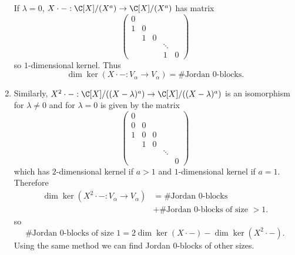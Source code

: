 \documentclass[a4paper]{article}
\theoremstyle{definition}
\begin{document}
\begin{remark}
\begin{enumerate}
    If \(\lambda = 0\), \(X \cdot -: \C[X]/(X^a) \to \C[X]/(X^a)\) has matrix
    \[
      \begin{pmatrix}
        0 \\
        1 & 0 \\
        & 1 & 0 \\
        & & & \ddots \\
        & & & 1 & 0
      \end{pmatrix}
    \]
    so \(1\)-dimensional kernel. Thus
    \[
      \dim \ker (X \cdot -: V_\alpha \to V_\alpha) = \# \text{Jordan \(0\)-blocks}.
    \]
  \item Similarly, \(X^2 \cdot -: \C[X]/((X - \lambda)^a) \to \C[X]/((X - \lambda)^a)\) is an isomorphism for \(\lambda \neq 0\) and for \(\lambda = 0\) is given by the matrix
    \[
      \begin{pmatrix}
        0 \\
        0 & 0 \\
        1 & 0 & 0 \\
        & 1 & 0 & \\
        & & & \ddots \\
        & & & & 0
      \end{pmatrix}
    \]
    which has \(2\)-dimensional kernel if \(a > 1\) and \(1\)-dimensional kernel if \(a = 1\). Therefore
    \begin{align*}
      \dim \ker (X^2 \cdot -: V_\alpha \to V_\alpha) &= \# \text{Jordan \(0\)-blocks} \\
                                                     &+ \# \text{Jordan \(0\)-blocks of size \(> 1\)}.
    \end{align*}
    so
    \[
      \# \text{Jordan \(0\)-blocks of size \(1\)} = 2 \dim \ker (X \cdot -) - \dim \ker (X^2 \cdot -).
    \]
    Using the same method we can find Jordan \(0\)-blocks of other sizes.
    \iffalse
    \begin{align*}
      \dim (X^r \cdot -: V_\alpha \to V_\alpha) &= \# \text{Jordan \(0\)-blocks} \\
                                                &+ \sum_{i = 1}^{r - 1} \# \text{Jordan \(0\)-blocks of size \(> i\)} \\
      \sum_{i = 1}^{r - 1} \# \text{blocks of size \(\leq i\)} &= r \cdot \dim \ker (X \cdot -) - \dim \ker (X^r \cdot -) \\
      \# \text{blocks of size \(\leq r - 1\)} &= r \cdot \dim \ker (X \cdot -) - \dim \ker (X^r \cdot -) \\
                                                &- (r - 1) \cdot \dim \ker (X \cdot -) + \dim \ker (X^{r - 1} \cdot -) \\
                                                &= \dim \ker (X \cdot -) - \dim \ker (X^r \cdot -) + \dim \ker (X^{r - 1} \cdot -) \\
      \# \text{blocks of size \(r\)} &= 2 \cdot \dim \ker (X^r \cdot -) - \dim \ker (X^{r + 1} \cdot -) - \dim \ker(X^{r - 1} \cdot -)
    \end{align*}
    \fi
  \end{enumerate}
\end{remark}
\end{document}
